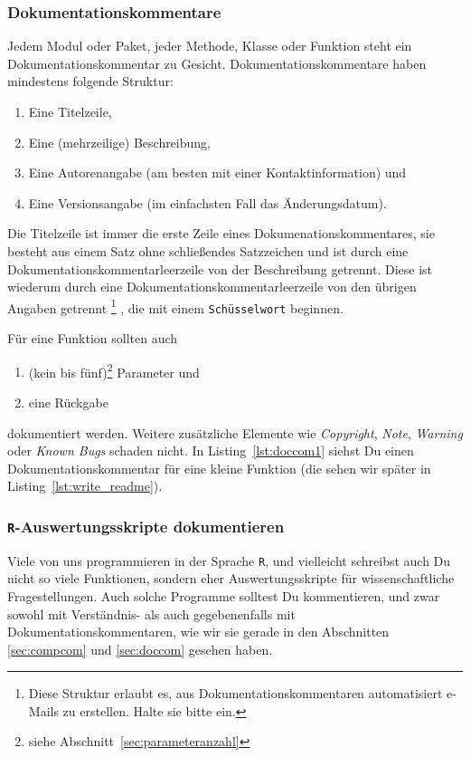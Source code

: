\documentclass[twoside]{scrartcl}
\providecommand{\R}{\texttt{R}}
\providecommand{\code}[1]{\texttt{#1}}
\begin{document}
\subsubsection{Dokumentationskommentare\label{sec:doccom}}
Jedem Modul oder Paket, jeder Methode, Klasse oder Funktion steht ein
Dokumentationskommentar zu Gesicht. Dokumentationskommentare haben mindestens 
folgende Struktur:
\begin{enumerate}
    \item Eine Titelzeile,
    \item Eine (mehrzeilige) Beschreibung,
    \item Eine Autorenangabe (am besten mit einer Kontaktinformation) und
    \item Eine Versionsangabe (im einfachsten Fall das \"A{}nderungsdatum).
\end{enumerate}
Die Titelzeile ist immer die erste Zeile eines Dokumenationskommentares, sie
besteht aus einem Satz ohne schlie\ss{}endes Satzzeichen und ist durch eine
Dokumentationskommentarleerzeile von der Beschreibung getrennt. Diese ist
wiederum durch eine Dokumentationskommentarleerzeile von den \"u{}brigen Angaben
getrennt%
\footnote{Diese Struktur erlaubt es, aus Dokumentationskommentaren
automatisiert e-Mails zu erstellen. Halte sie bitte ein.}%
, die mit einem \code{Sch\"u{}sselwort} beginnen.

F\"u{}r eine Funktion sollten auch 
\begin{enumerate}[resume]
    \item (kein bis f\"u{}nf)\footnote{siehe
	    Abschnitt~\ref{sec:parameteranzahl}} Parameter und 
    \item eine R\"u{}ckgabe
\end{enumerate}
dokumentiert werden. Weitere zus\"a{}tzliche Elemente wie \emph{Copyright},
\emph{Note}, \emph{Warning} oder \emph{Known Bugs} schaden nicht.
In Listing~\ref{lst:doccom1} siehst Du einen Dokumentationskommentar
f\"u{}r eine kleine Funktion (die sehen wir sp\"a{}ter in
Listing~\ref{lst:write_readme}).


\subsubsection{\R{}-Auswertungsskripte dokumentieren
\label{sec:rdoc}
}
Viele von uns programmieren in der Sprache \R{}, und vielleicht schreibst 
auch Du nicht so viele Funktionen, sondern eher Auswertungsskripte f\"u{}r 
wissenschaftliche Fragestellungen. 
Auch solche Programme solltest Du kommentieren, und zwar sowohl mit 
Verst\"a{}ndnis- als auch gegebenenfalls mit  Dokumentationskommentaren, wie wir
sie gerade in den Abschnitten \ref{sec:compcom} und \ref{sec:doccom} gesehen 
haben.
\end{document}

